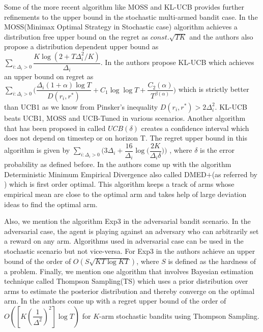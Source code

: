 	Some of the more recent algorithm like MOSS and KL-UCB provides further refinements to the upper bound in the stochastic multi-armed bandit case. In \cite{audibert2009minimax} the MOSS(Minimax Optimal  Strategy in Stochastic case) algorithm achieves a distribution free upper bound on the regret as $const.\sqrt{TK}$ and the authors also propose a distribution dependent upper bound as \\$\sum_{i:\Delta_{i}>0}\dfrac{K\log(2+T\Delta_{i}^{2}/K)}{\Delta_{i}}$. In \cite{garivier2011kl} the authors propose KL-UCB which achieves an upper bound on regret as $\sum_{i:\Delta_{i}>0}\bigg(\dfrac{\Delta_{i}(1+\alpha)\log T}{D(r_{i},r^{*})}+C_{1}\log\log T+\dfrac{C_{2}(\alpha)}{T^{\beta(\alpha)}}\bigg)$ which is strictly better than UCB1 as we know from Pinsker's inequality $D(r_{i},r^{*}) > 2\Delta_{i}^{2}$. KL-UCB beats UCB1, MOSS and UCB-Tuned in various scenarios. Another algorithm that has been proposed in \cite{abbasi2011improved} called $UCB(\delta)$ creates a confidence interval which does not depend on timestep or 
on horizon T. The regret upper bound in this algorithm is given by $\sum_{i:\Delta_{i}>0}\bigg(3\Delta_{i}+\dfrac{16}{\Delta_{i}}\log\big(\dfrac{2K}{\Delta_{i}\delta}\big)\bigg)$ , where $\delta$ is the error probability as defined before. In \cite{honda2010asymptotically} the authors come up with the algorithm Deterministic Minimum Empirical Divergence also called DMED$+$(as referred by \cite{garivier2011kl}) which is first order optimal. This algorithm keeps a track of arms whose empirical mean are close to the optimal arm and takes help of large deviation ideas to find the optimal arm.
	
	Also, we mention the algorithm Exp3 in the adversarial bandit scenario. In the adversarial case, the agent is playing against an adversary who can arbitrarily set a reward on any arm. Algorithms used in adversarial case can be used in the stochastic scenario but not vice-versa. For Exp3 in \cite{auer2002nonstochastic} the authors achieve an upper bound of the order of $O(S\sqrt{KT\log KT})$, where $S$ is defined as the hardness of a problem. Finally, we mention one algorithm that involves Bayesian estimation technique called Thompson Sampling(TS) which uses a prior distribution over arms to estimate the posterior distribution and thereby converge on the optimal arm. In \cite{agrawal2011analysis} the authors come up with a regret upper bound of the order of $O([K(\dfrac{1}{\Delta^{2}})^{2}]\log T)$ for $K$-arm stochastic bandits using Thompson Sampling. 


